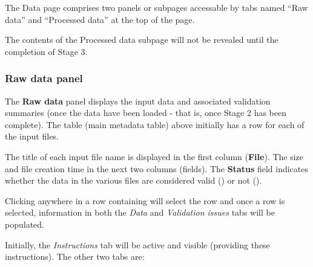 \documentclass[
  8pt,
  a4paper]{article}
\begin{document}
The Data page comprises two panels or subpages accessable by tabs named
``Raw data'' and ``Processed data'' at the top of the page.

\begin{tcolorbox}[enhanced jigsaw, opacityback=0, colbacktitle=quarto-callout-note-color!10!white, breakable, toprule=.15mm, left=2mm, bottomrule=.15mm, title=\textcolor{quarto-callout-note-color}{\faInfo}\hspace{0.5em}{Note}, bottomtitle=1mm, leftrule=.75mm, arc=.35mm, opacitybacktitle=0.6, coltitle=black, toptitle=1mm, titlerule=0mm, rightrule=.15mm, colback=white, colframe=quarto-callout-note-color-frame]

The contents of the Processed data subpage will not be revealed until
the completion of Stage 3.

\end{tcolorbox}

\subsubsection{Raw data panel}\label{raw-data-panel}

The \textbf{Raw data} panel displays the input data and associated
validation summaries (once the data have been loaded - that is, once
Stage 2 has been complete). The table (main metadata table) above
initially has a row for each of the input files.

The title of each input file name is displayed in the first column
(\textbf{File}). The size and file creation time in the next two columns
(fields). The \textbf{Status} field indicates whether the data in the
various files are considered valid ({}) or not ({}).

Clicking anywhere in a row containing will select the row and once a row
is selected, information in both the \emph{Data} and \emph{Validation
issues} tabs will be populated.

Initially, the \emph{Instructions} tab will be active and visible
(providing these instructions). The other two tabs are:
\end{document}
